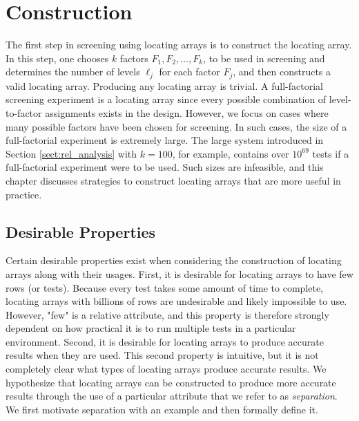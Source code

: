 \chapter{Construction} \label{chptr:construction}

The first step in screening using locating arrays is to construct the locating array.
In this step, one chooses $k$ factors $F_1, F_2, \dots, F_k$, to be used in screening and determines the number of levels $\ell_j$ for each factor $F_j$, and then constructs a valid locating array.
Producing any locating array is trivial.
A full-factorial screening experiment is a locating array since every possible combination of level-to-factor assignments exists in the design.
However, we focus on cases where many possible factors have been chosen for screening.
In such cases, the size of a full-factorial experiment is extremely large.
The large system introduced in Section \ref{sect:rel_analysis} with $k = 100$, for example, contains over $10^{69}$ tests if a full-factorial experiment were to be used.
Such sizes are infeasible, and this chapter discusses strategies to construct locating arrays that are more useful in practice.

\section{Desirable Properties} \label{sect:properties}

Certain desirable properties exist when considering the construction of locating arrays along with their usages.
First, it is desirable for locating arrays to have few rows (or tests).
Because every test takes some amount of time to complete, locating arrays with billions of rows are undesirable and likely impossible to use.
However, "few" is a relative attribute, and this property is therefore strongly dependent on how practical it is to run multiple tests in a particular environment.
Second, it is desirable for locating arrays to produce accurate results when they are used.
This second property is intuitive, but it is not completely clear what types of locating arrays produce accurate results.
We hypothesize that locating arrays can be constructed to produce more accurate results through the use of a particular attribute that we refer to as {\em separation}.
We first motivate separation with an example and then formally define it.


